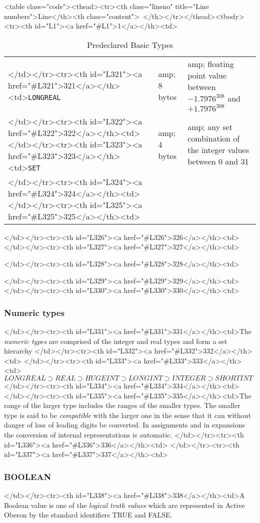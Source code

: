 <table class="code"><thead><tr><th class="lineno" title="Line numbers">Line</th><th class="content"> </th></tr></thead><tbody><tr><th id="L1"><a href="#L1">1</a></th><td>\documentclass[a4paper,11pt]{article}
\begin{document}
\begin{table}[h!]
\begin{tabular}{|l|l|l|}
</td></tr><tr><th id="L321"><a href="#L321">321</a></th><td>\verb+LONGREAL+ &amp; 8 bytes &amp; floating point value between $-1.7976^{308}$ and $+1.7976^{308}$ \\
</td></tr><tr><th id="L322"><a href="#L322">322</a></th><td>\hline
</td></tr><tr><th id="L323"><a href="#L323">323</a></th><td>\verb+SET+ &amp; 4 bytes &amp; any set combination of the integer values between 0 and 31 \\
</td></tr><tr><th id="L324"><a href="#L324">324</a></th><td>\hline
</td></tr><tr><th id="L325"><a href="#L325">325</a></th><td>\end{tabular}
</td></tr><tr><th id="L326"><a href="#L326">326</a></th><td>
</td></tr><tr><th id="L327"><a href="#L327">327</a></th><td>\caption{Predeclared Basic Types}\label{table:BasicTypes}
</td></tr><tr><th id="L328"><a href="#L328">328</a></th><td>\end{table}
</td></tr><tr><th id="L329"><a href="#L329">329</a></th><td>
</td></tr><tr><th id="L330"><a href="#L330">330</a></th><td>\subsubsection{Numeric types} \label{section:HierarchyNumericTypes}
</td></tr><tr><th id="L331"><a href="#L331">331</a></th><td>The {\em numeric types} are comprised of the integer and real types and form a set hierarchy
</td></tr><tr><th id="L332"><a href="#L332">332</a></th><td>
</td></tr><tr><th id="L333"><a href="#L333">333</a></th><td>$LONGREAL \supset REAL \supset HUGEINT \supset LONGINT \supset INTEGER \supset SHORTINT$
</td></tr><tr><th id="L334"><a href="#L334">334</a></th><td>
</td></tr><tr><th id="L335"><a href="#L335">335</a></th><td>The range of the larger type includes the ranges of the smaller types. The smaller type is said to be {\em compatible} with the larger one in the sense that it can without danger of loss of leading digits be converted. In assignments and in expansions the conversion of internal representations is automatic.
</td></tr><tr><th id="L336"><a href="#L336">336</a></th><td>
</td></tr><tr><th id="L337"><a href="#L337">337</a></th><td>\subsubsection{BOOLEAN} \label{section:BooleanType}
</td></tr><tr><th id="L338"><a href="#L338">338</a></th><td>A Boolean value is one of the {\em logical truth values} which are represented in Active Oberon by the standard identifiers TRUE and FALSE.
\end{document}
